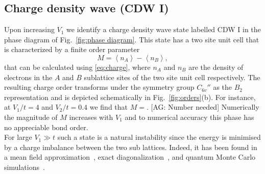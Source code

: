 \documentclass[aps,prx,10pt,twocolumn,floatfix,superscriptaddress,showpacs,numerical,footinbib]{revtex4-1}
\newcommand{\noteAG}[1]{{\color{blue} [AG: #1]}}
\begin{document}
\subsection{Charge density wave (CDW I)}
%
Upon increasing $V_{1}$ we identify a charge density wave state labelled CDW I in the phase diagram of Fig.~\ref{fig:phase diagram}.
%
This state has a two site unit cell that is characterized by a finite order parameter
%
\begin{equation}
\label{eq:CDW}
%
M=\left\langle n_{A} \right\rangle-\left\langle n_{B}\right\rangle,
%
\end{equation}
%
that can be calculated using \eqref{eq:charge}, where $n_{A}$ and $n_{B}$ are the density of electrons in the $A$ and $B$ sublattice sites of the two site unit cell respectively. 
%
The resulting charge order transforms under the symmetry group $C_{6v}''$ as the $B_2$ representation and is depicted schematically in Fig.~\ref{fig:orders}(b). 
%
For instance, at $V_{1}/t = 4$ and $V_{2}/t = 0.4$ we find that $M=$. \noteAG{Number needed}
%
Numerically the magnitude of $M$ increases with $V_{1}$ and to numerical accuracy this phase has no appreciable bond order.\\
For large $V_{1}\gg t$ such a state is a natural instability since the energy is minimised by a charge imbalance between the two sub lattices.
%
Indeed, it has been found in a mean field approximation~\cite{RQHZ08,WF10,GCC13}, exact diagonalization~\cite{GGNVC13,DH14,DCH14}, 
and quantum Monte Carlo simulations~\cite{WCT14}.
%
\end{document}
